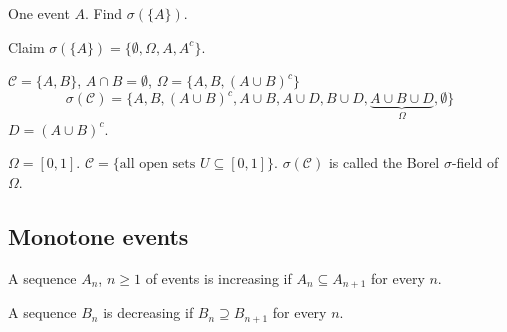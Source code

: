 \documentclass[10pt, a4paper]{article}
\begin{document}
\begin{example}
    One event $A$.
    Find $\sigma(\{A\})$.

    Claim $\sigma(\{A\}) = \{\emptyset, \Omega, A, A ^ c\}$.
\end{example}

\begin{example}
    $\mathcal{C} = \{A, B\}$,
    $A \cap B = \emptyset$,
    $\Omega = \{A, B, (A \cup B) ^ c\}$
    \[
    \sigma(\mathcal{C}) = \{A, B, (A \cup B) ^ c, A \cup B, A \cup D, B \cup D, \underbrace{A \cup B \cup D}_{\Omega}, \emptyset\}
    \]
    $D = (A \cup B) ^ c$.
\end{example}

\begin{example}
    $\Omega = [0, 1]$.
    $\mathcal{C} = \{\text{all open sets $U \subseteq [0, 1]$}\}$.
    $\sigma(\mathcal{C})$ is called the Borel $\sigma$-field of $\Omega$.
\end{example}

\subsection{Monotone events}
\begin{definition}
    A sequence $A_n$,
    $n \geq 1$ of events is increasing if $A_n \subseteq A_{n + 1}$ for every $n$.
    
    A sequence $B_n$ is decreasing if $B_n \supseteq B_{n + 1}$ for every $n$.
\end{definition}
\end{document}
